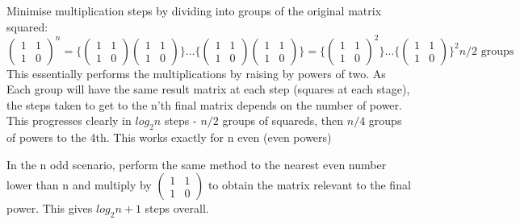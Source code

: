 \documentclass[11pt, a4paper]{article}
\begin{document}
{Minimise multiplication steps by dividing into groups of the original matrix squared:
        \[\begin{pmatrix}
          1 & 1 \\
          1 & 0
        \end{pmatrix} ^n =
        \bigg\{ \begin{pmatrix}
          1 & 1 \\
          1 & 0
        \end{pmatrix}
        \begin{pmatrix}
          1 & 1 \\
          1 & 0
        \end{pmatrix}\bigg\}
        \dots
        \bigg\{ \begin{pmatrix}
          1 & 1 \\
          1 & 0
      \end{pmatrix}
        \begin{pmatrix}
          1 & 1 \\
          1 & 0
      \end{pmatrix} \bigg\} =
      \bigg\{ \begin{pmatrix}
          1 & 1 \\
          1 & 0
        \end{pmatrix} ^2 \bigg\}
        \dots
        \bigg\{ \begin{pmatrix}
          1 & 1 \\
          1 & 0
      \end{pmatrix} \bigg\}^2
    \mbox{$n/2$ groups}\]
 This essentially performs the multiplications by raising by powers of two. As Each group will
 have the same result matrix at each step (squares at each stage), the steps taken to get to the
 n'th final matrix depends on the number of power. This progresses clearly in $log_2 n$
 steps - $n/2$ groups of squareds, then $n/4$ groups of powers to the 4th.
This works exactly for n even (even powers)

In the n odd scenario, perform the same method to the nearest even number lower than n and multiply by
        $ \begin{pmatrix}
          1 & 1 \\
          1 & 0
      \end{pmatrix} $ to obtain the matrix relevant to the final power. This gives $log_2n + 1$ steps overall.

}
\end{document}
